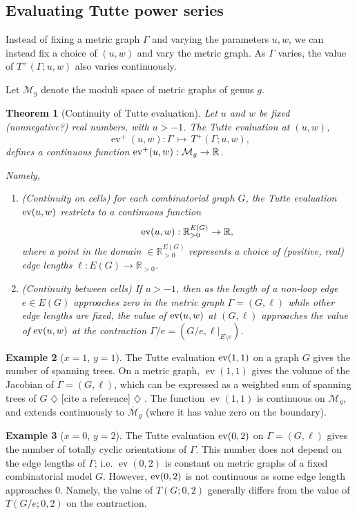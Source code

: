 \documentclass{amsart}
\newtheorem{thm}{Theorem}
\theoremstyle{definition}
\newtheorem{eg}[thm]{Example}
\newcommand{\RR}{\mathbb{R}}
\newcommand{\RRpos}{\RR_{>0}}
\DeclareMathOperator{\ev}{ev}
\newcommand{\harry}[1]{{\color{red} \sf $\diamondsuit$  {#1} $\diamondsuit$ }}
\newcommand{\note}[1]{\harry{#1}}
\begin{document}
\subsection{Evaluating Tutte power series}

Instead of fixing a metric graph $\Gamma$ and varying the parameters $u,w$,
we can instead fix a choice of $(u,w)$ and vary the metric graph.
As $\Gamma$ varies, the value of $T^+(\Gamma;u,w)$ also varies continuously.

Let $\mathcal M_g$ denote the moduli space of metric graphs of genus $g$.
\begin{thm}[Continuity of Tutte evaluation]
\label{thm:tutte-eval-moduli}
Let $u$ and $w$ be fixed (nonnegative?) real numbers,
with $u > -1$.
The Tutte evaluation at $(u,w)$,
$$ \ev^+(u,w) : \Gamma \,\mapsto\, T^+(\Gamma; u,w) ,$$
defines a continuous function  
${\rm ev}^+(u,w) : \mathcal M_g \to \RR$.

Namely, 
\begin{enumerate}
\item 
(Continuity on cells)
for each combinatorial graph $G$,
the Tutte evaluation 
${\rm ev}(u,w) $ 
restricts to a continuous function
$$ {\rm ev}(u,w) : \RRpos^{E(G)} \to \RR,$$ 
where a point in the domain $ \in \RRpos^{E(G)}$
represents a choice of (positive, real) edge lengths  $\ell : E(G) \to \RRpos$.

\item 
(Continuity between cells)
If $u > -1$, then as the length of a  non-loop edge $e \in E(G)$ approaches zero
in the metric graph $\Gamma = (G,\ell)$
while other edge lengths are fixed,
the value of 
${\rm ev}(u,w)$
at $(G,\ell)$ %
approaches the value of ${\rm ev}(u,w)$ at the contraction 
$\Gamma / e = (G / e, \ell \big|_{E\setminus e})$.
\end{enumerate}
\end{thm}

\begin{eg}
[$x = 1$, $y=1$]
The Tutte evaluation ${\rm ev}(1,1)$ 
on a graph $G$ gives the number of spanning trees.
On a metric graph, $\ev(1,1)$ gives the volume of the Jacobian of
$\Gamma = (G,\ell)$,
which can be expressed as a weighted sum of spanning trees of $G$ \note{[cite a reference]}.
The function $\ev(1,1)$ is continuous on $\mathcal M_g$, 
and extends continuously to $\overline{\mathcal M}_g$ 
(where it has value zero on the boundary).
\end{eg}
\begin{eg}
[$x = 0$, $y=2$]
The Tutte evaluation ${\rm ev}(0,2)$ 
on $\Gamma = (G,\ell)$ gives the number of totally cyclic orientations of $\Gamma$.
This number does not depend on the edge lengths of $\Gamma$;
i.e. $\ev(0,2)$
 is constant on metric graphs %
of a fixed combinatorial model $G$.
However, ${\rm ev}(0,2)$ is not continuous as some edge length approaches $0$.
Namely, the value of $T(G; 0, 2)$ generally differs from the value of $T(G/e; 0,2)$
on the contraction.
\end{eg}
\end{document}

